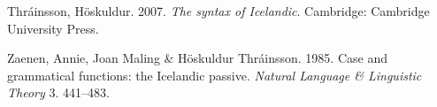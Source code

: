 \begin{styleStandard}
Thráinsson, Höskuldur. 2007. \textit{The syntax of Icelandic}. Cambridge: Cambridge University Press.
\end{styleStandard}

\begin{styleStandard}
Zaenen, Annie, Joan Maling \& Höskuldur Thráinsson. 1985. Case and grammatical functions: the Icelandic passive. \textit{Natural Language \& Linguistic Theory }3. 441–483.
\end{styleStandard}

